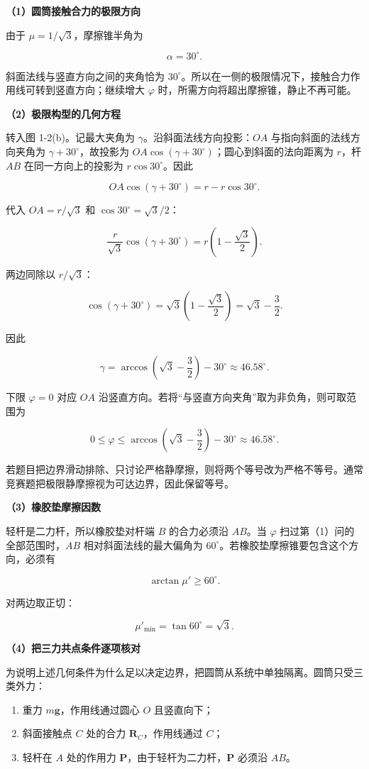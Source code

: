 \documentclass[12pt,a4paper,UTF8]{ctexart}
\newcommand{\tightlist}{\setlength{\itemsep}{0pt}\setlength{\parskip}{0pt}}
\begin{document}
\textbf{（1）圆筒接触合力的极限方向}

由于 \(\mu=1/\sqrt3\)，摩擦锥半角为

\[
\alpha=30^\circ.
\]

斜面法线与竖直方向之间的夹角恰为
\(30^\circ\)。所以在一侧的极限情况下，接触合力作用线可转到竖直方向；继续增大
\(\varphi\) 时，所需方向将超出摩擦锥，静止不再可能。

\textbf{（2）极限构型的几何方程}

转入图 1-2(b)。记最大夹角为 \(\gamma\)。沿斜面法线方向投影：\(OA\)
与指向斜面的法线方向夹角为 \(\gamma+30^\circ\)，故投影为
\(OA\cos(\gamma+30^\circ)\)；圆心到斜面的法向距离为 \(r\)，杆 \(AB\)
在同一方向上的投影为 \(r\cos30^\circ\)。因此

\[
OA\cos(\gamma+30^\circ)
=r-r\cos30^\circ.
\]

代入 \(OA=r/\sqrt3\) 和 \(\cos30^\circ=\sqrt3/2\)：

\[
\frac r{\sqrt3}\cos(\gamma+30^\circ)
=r\left(1-\frac{\sqrt3}{2}\right).
\]

两边同除以 \(r/\sqrt3\)：

\[
\cos(\gamma+30^\circ)
=\sqrt3\left(1-\frac{\sqrt3}{2}\right)
=\sqrt3-\frac32.
\]

因此

\[
\gamma
=\arccos\left(\sqrt3-\frac32\right)-30^\circ
\approx46.58^\circ.
\]

下限 \(\varphi=0\) 对应 \(OA\)
沿竖直方向。若将``与竖直方向夹角''取为非负角，则可取范围为

\[
\boxed{
0\leq\varphi\leq
\arccos\left(\sqrt3-\frac32\right)-30^\circ
\approx46.58^\circ
}.
\]

若题目把边界滑动排除、只讨论严格静摩擦，则将两个等号改为严格不等号。通常竞赛题把极限静摩擦视为可达边界，因此保留等号。

\textbf{（3）橡胶垫摩擦因数}

轻杆是二力杆，所以橡胶垫对杆端 \(B\) 的合力必须沿 \(AB\)。当 \(\varphi\)
扫过第（1）问的全部范围时，\(AB\) 相对斜面法线的最大偏角为
\(60^\circ\)。若橡胶垫摩擦锥要包含这个方向，必须有

\[
\arctan\mu'\geq60^\circ.
\]

对两边取正切：

\[
\boxed{\mu'_{\min}=\tan60^\circ=\sqrt3}.
\]

\textbf{（4）把三力共点条件逐项核对}

为说明上述几何条件为什么足以决定边界，把圆筒从系统中单独隔离。圆筒只受三类外力：

\begin{enumerate}
\def\labelenumi{\arabic{enumi}.}
\tightlist
\item
  重力 \(m\bm g\)，作用线通过圆心 \(O\) 且竖直向下；
\item
  斜面接触点 \(C\) 处的合力 \(\bm R_C\)，作用线通过 \(C\)；
\item
  轻杆在 \(A\) 处的作用力 \(\bm P\)，由于轻杆为二力杆，\(\bm P\) 必须沿
  \(AB\)。
\end{enumerate}
\end{document}
